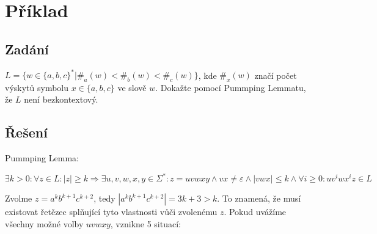 \documentclass[11pt, a4paper]{article}
\begin{document}
\clearpage
\maketitle
\section{Příklad}
\subsection*{Zadání}
$L = \{w \in \{a, b, c\}^* | \#_a(w) < \#_b(w) < \#_c(w)\}$, kde $\#_x(w)$ značí počet výskytů symbolu $x \in \{a, b, c\}$ ve slově $w$. Dokažte pomocí Pummping Lemmatu, že $L$ není bezkontextový.
\subsection*{Řešení}
Pummping Lemma:

$\exists k > 0: \forall z \in L: |z| \geq k \Rightarrow \exists u, v, w, x, y \in \Sigma^*: z = uvwxy \wedge vx \neq \varepsilon \wedge |vwx| \leq k \wedge \forall i \geq 0: uv^iwx^iz \in L$

\noindent Zvolme $z = a^kb^{k+1}c^{k+2}$, tedy $|a^kb^{k+1}c^{k+2}| = 3k + 3 > k$. To znamená, že musí existovat řetězec splňující tyto vlastnosti vůči zvolenému $z$. Pokud uvážíme všechny možné volby $uvwxy$, vznikne 5 situací:
\end{document}
